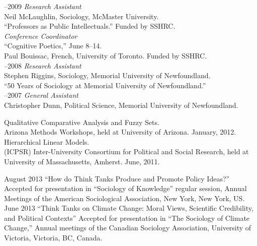 \documentclass[11pt,usenames,dvipsnames]{article}
\begin{document}
–2009 {\it Research Assistant}\\
Neil McLaughlin, Sociology, McMaster University.\\ 
``Professors as Public Intellectuals.'' Funded by SSHRC.\\

 {\it Conference Coordinator}\\
``Cognitive Poetics,'' June 8–14.\\ 
Paul Bouissac, French, University of Toronto. Funded by SSHRC.\\

–2008 {\it Research Assistant}\\
Stephen Riggins, Sociology, Memorial University of Newfoundland.\\ 
``50 Years of Sociology at Memorial University of Newfoundland.''\\

–2007 {\it General Assistant}\\
Christopher Dunn, Political Science, Memorial University of Newfoundland.\\



\noindent Qualitative Comparative Analysis and Fuzzy Sets.\\ 
Arizona Methods Workshops, held at University of Arizona. January, 2012.\\

\noindent Hierarchical Linear Models.\\ 
(ICPSR) Inter-University Consortium for Political and Social Research, held at University of Massachusetts, Amherst. June, 2011.\\




\ind August 2013 ``How do Think Tanks Produce and Promote Policy Ideas?'' Accepted for presentation in ``Sociology of Knowledge'' regular session, Annual Meetings of the American Sociological Association, New York, New York, US. \\

\ind June 2013 ``Think Tanks on Climate Change: Moral Views, Scientific Credibility, and Political Contexts'' Accepted for presentation in ``The Sociology of Climate Change,'' Annual meetings of the Canadian Sociology Association, University of Victoria, Victoria, BC, Canada. \\
\end{document}
